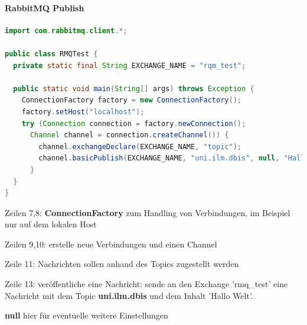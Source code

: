 \documentclass[10pt]{article}
\begin{document}
\paragraph{RabbitMQ Publish}
\begin{lstlisting}[language=java]
import com.rabbitmq.client.*;

public class RMQTest {
  private static final String EXCHANGE_NAME = "rqm_test";

  public static void main(String[] args) throws Exception {
    ConnectionFactory factory = new ConnectionFactory();
    factory.setHost("localhost");
    try (Connection connection = factory.newConnection();
      Channel channel = connection.createChannel()) {
        channel.exchangeDeclare(EXCHANGE_NAME, "topic");
        channel.basicPublish(EXCHANGE_NAME, "uni.ilm.dbis", null, "Hallo Welt".getBytes("UTF-8"));
      }
  }
}
\end{lstlisting}
\begin{itemize*}
  \item Zeilen 7,8: \textbf{ConnectionFactory} zum Handling von Verbindungen, im Beispiel nur auf dem lokalen Host
  \item Zeilen 9,10: erstelle neue Verbindungen und einen Channel
  \item Zeile 11: Nachrichten sollen anhand des Topics zugestellt werden
  \item Zeile 13: veröffentliche eine Nachricht: sende an den Exchange 'rmq\_test' eine Nachricht mit dem Topic \textbf{uni.ilm.dbis} und dem Inhalt 'Hallo Welt'.
  \begin{itemize*}
    \item \textbf{null} hier für eventuelle weitere Einstellungen
  \end{itemize*}
\end{itemize*}
\end{document}
